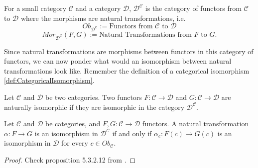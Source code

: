 \begin{definition}
	For a small category $\mathcal C$ and a category $\mathcal D$,
	$\mathcal D^{\mathcal C}$ is the category of functors
	from $\mathcal C$ to $\mathcal D$ where the morphisms are natural transformations,
	i.e.
	\begin{displaymath}
		Ob_{\mathcal D^{\mathcal C}} :={\text{Functors from } \mathcal C \text{ to } \mathcal D}
	\end{displaymath}
	\begin{displaymath}
		Mor_{\mathcal D^{\mathcal C}}(F,G) :={\text{Natural Transformations from }
		F \text{ to } G}.
	\end{displaymath}
\end{definition}

Since natural transformations are morphisms between functors in this category of functors,
we can now ponder what would an isomorphism between natural transformations look like.
Remember the definition of a categorical isomorphism \ref{def:CategoricalIsomorphism}.

\begin{definition}
	Let $\mathcal C$ and $\mathcal D$ be two categories. Two functors
	$F:\mathcal C \to\mathcal D$ and $G:\mathcal C \to\mathcal D$
	are naturally isomorphic if they are isomorphic in the category $\mathcal D^\mathcal C$.
\end{definition}

\begin{theorem}
	Let $\mathcal C$ and $\mathcal D$ be categories, and $F,G:\mathcal C \to \mathcal D$ functors.
	A natural transformation $\alpha : F \to G$ is an isomorphism in $\mathcal D^\mathcal C$
	if and only if $\alpha_c: F(c) \to G(c)$ is an isomorphism in $\mathcal D$ for every
	$c \in Ob_\mathcal C$.
\end{theorem}
\begin{proof}
	Check proposition 5.3.2.12 from \citet{spivak2014category}.
\end{proof}


